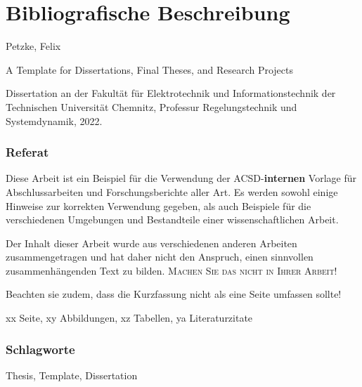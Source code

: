 \setcounter{page}{1}
\chapter*{\bfseries Bibliografische Beschreibung} %

Petzke, Felix

A Template for Dissertations, Final Theses, and Research Projects

Dissertation an der Fakultät für Elektrotechnik und Informationstechnik der Technischen Universität Chemnitz, Professur Regelungstechnik und Systemdynamik, 2022.

\subsection*{Referat}
Diese Arbeit ist ein Beispiel für die Verwendung der ACSD-\textbf{internen} Vorlage für Abschlussarbeiten und Forschungsberichte aller Art. Es werden sowohl einige Hinweise zur korrekten Verwendung gegeben, als auch Beispiele f{\"u}r die verschiedenen Umgebungen und Bestandteile einer wissenschaftlichen Arbeit.

Der Inhalt dieser Arbeit wurde aus verschiedenen anderen Arbeiten zusammengetragen und hat daher nicht den Anspruch, einen sinnvollen zusammenh{\"a}ngenden Text zu bilden. \textsc{Machen Sie das nicht in Ihrer Arbeit!}

Beachten sie zudem, dass die Kurzfassung nicht als eine Seite umfassen sollte!

xx Seite, xy Abbildungen, xz Tabellen, ya Literaturzitate

\subsection*{Schlagworte}
Thesis, Template, Dissertation

\cleardoublepage